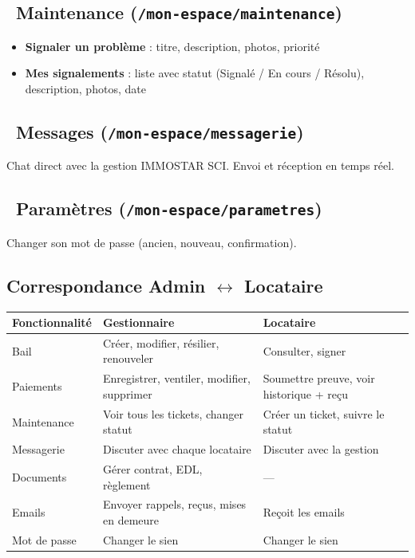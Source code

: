 \documentclass[12pt,a4paper]{article}
\begin{document}
\subsection{\faWrench\ Maintenance (\texttt{/mon-espace/maintenance})}
\begin{itemize}
\item \textbf{Signaler un probl\`eme} : titre, description, photos, priorit\'e
\item \textbf{Mes signalements} : liste avec statut (Signal\'e / En cours / R\'esolu), description, photos, date
\end{itemize}

\subsection{\faComments\ Messages (\texttt{/mon-espace/messagerie})}
Chat direct avec la gestion IMMOSTAR SCI. Envoi et r\'eception en temps r\'eel.

\subsection{\faCog\ Param\`etres (\texttt{/mon-espace/parametres})}
Changer son mot de passe (ancien, nouveau, confirmation).

\subsection{Correspondance Admin $\leftrightarrow$ Locataire}

\begin{tabularx}{\textwidth}{lXX}
\toprule
\textbf{Fonctionnalit\'e} & \textbf{Gestionnaire} & \textbf{Locataire} \\
\midrule
Bail & Cr\'eer, modifier, r\'esilier, renouveler & Consulter, signer \\
Paiements & Enregistrer, ventiler, modifier, supprimer & Soumettre preuve, voir historique + re\c{c}u \\
Maintenance & Voir tous les tickets, changer statut & Cr\'eer un ticket, suivre le statut \\
Messagerie & Discuter avec chaque locataire & Discuter avec la gestion \\
Documents & G\'erer contrat, EDL, r\`eglement & --- \\
Emails & Envoyer rappels, re\c{c}us, mises en demeure & Re\c{c}oit les emails \\
Mot de passe & Changer le sien & Changer le sien \\
\bottomrule
\end{tabularx}
\end{document}
